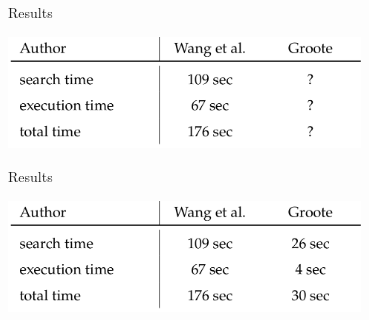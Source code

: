 \begin{frame}[fragile]{Results} 
\begin{center}
 \includegraphics[width=0.7\textwidth]{figures/results/wang_groote_1}
\end{center}
\end{frame}

\begin{frame}[fragile]{Results} 
\begin{center}
 \includegraphics[width=0.7\textwidth]{figures/results/wang_groote_4}
\end{center}
\end{frame}





